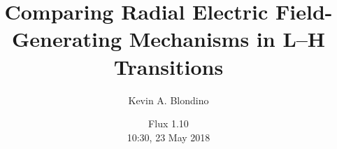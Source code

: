 \documentclass[12pt,a4paper]{article}
\title{Comparing Radial Electric Field-Generating Mechanisms in L--H Transitions}
\author{Kevin A. Blondino}
\date{Flux 1.10 \\ \vspace*{5mm} 10:30, 23 May 2018}
\begin{document}
\maketitle

\begin{abstract}
	
\end{abstract}
\end{document}
